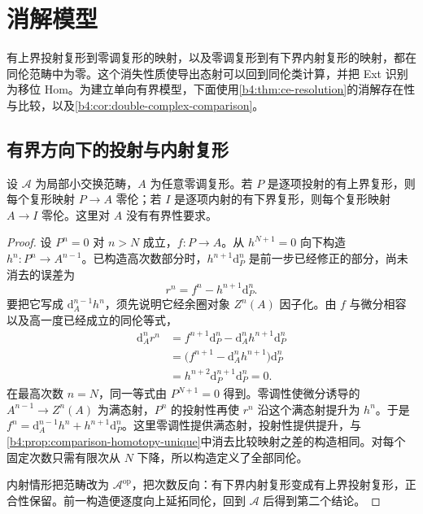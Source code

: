 
\section{消解模型}
\label{b4:sec:1704}

有上界投射复形到零调复形的映射，以及零调复形到有下界内射复形的映射，都在同伦范畴中为零。这个消失性质使导出态射可以回到同伦类计算，并把 Ext 识别为移位 Hom。为建立单向有界模型，下面使用\cref{b4:thm:ce-resolution}的消解存在性与比较，以及\cref{b4:cor:double-complex-comparison}。


%
%
%

\subsection{有界方向下的投射与内射复形}
\label{b4:subsec:1704:01}

\begin{lemma}\label{b4:lem:bounded-resolution-nullhomotopy}
	设 \(\mathcal A\) 为局部小交换范畴，\(A\) 为任意零调复形。若 \(P\) 是逐项投射的有上界复形，则每个复形映射 \(P\to A\) 零伦；若 \(I\) 是逐项内射的有下界复形，则每个复形映射 \(A\to I\) 零伦。这里对 \(A\) 没有有界性要求。
\end{lemma}
\begin{proof}
	设 \(P^n=0\) 对 \(n>N\) 成立，\(f:P\to A\)。从 \(h^{N+1}=0\) 向下构造 \(h^n:P^n\to A^{n-1}\)。已构造高次数部分时，\(h^{n+1}\mathrm{d}_P^n\) 是前一步已经修正的部分，尚未消去的误差为
	\[
		r^n=f^n-h^{n+1}\mathrm{d}_P^n.
	\]
	要把它写成 \(\mathrm{d}_A^{n-1}h^n\)，须先说明它经余圈对象 \(Z^n(A)\) 因子化。由 \(f\) 与微分相容以及高一度已经成立的同伦等式，
	\[
		\begin{aligned}
			\mathrm{d}_A^nr^n &=f^{n+1}\mathrm{d}_P^n -\mathrm{d}_A^nh^{n+1}\mathrm{d}_P^n\\
			&=\bigl(f^{n+1}-\mathrm{d}_A^nh^{n+1}\bigr)\mathrm{d}_P^n\\
			&=h^{n+2}\mathrm{d}_P^{n+1}\mathrm{d}_P^n=0.
		\end{aligned}
	\]
	在最高次数 \(n=N\)，同一等式由 \(P^{N+1}=0\) 得到。零调性使微分诱导的 \(A^{n-1}\to Z^n(A)\) 为满态射，\(P^n\) 的投射性再使 \(r^n\) 沿这个满态射提升为 \(h^n\)。于是 \(f^n=\mathrm{d}_A^{n-1}h^n+h^{n+1}\mathrm{d}_P^n\)。这里零调性提供满态射，投射性提供提升，与\cref{b4:prop:comparison-homotopy-unique}中消去比较映射之差的构造相同。对每个固定次数只需有限次从 \(N\) 下降，所以构造定义了全部同伦。

	内射情形把范畴改为 \(\mathcal A^{\mathrm{op}}\)，把次数反向：有下界内射复形变成有上界投射复形，正合性保留。前一构造便逐度向上延拓同伦，回到 \(\mathcal A\) 后得到第二个结论。
\end{proof}


